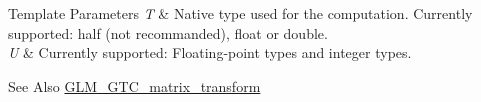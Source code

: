 \begin{DoxyTemplParams}{Template Parameters}
{\em T} & Native type used for the computation. Currently supported\-: half (not recommanded), float or double. \\
\hline
{\em U} & Currently supported\-: Floating-\/point types and integer types. \\
\hline
\end{DoxyTemplParams}
\begin{DoxySeeAlso}{See Also}
\hyperlink{group__gtc__matrix__transform}{G\-L\-M\-\_\-\-G\-T\-C\-\_\-matrix\-\_\-transform} 
\end{DoxySeeAlso}
